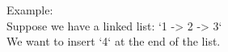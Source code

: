\documentclass[preview]{standalone}
\begin{document}
Example:\\Suppose we have a linked list: `1 -> 2 -> 3`\\We want to insert `4` at the end of the list.\\
\end{document}
